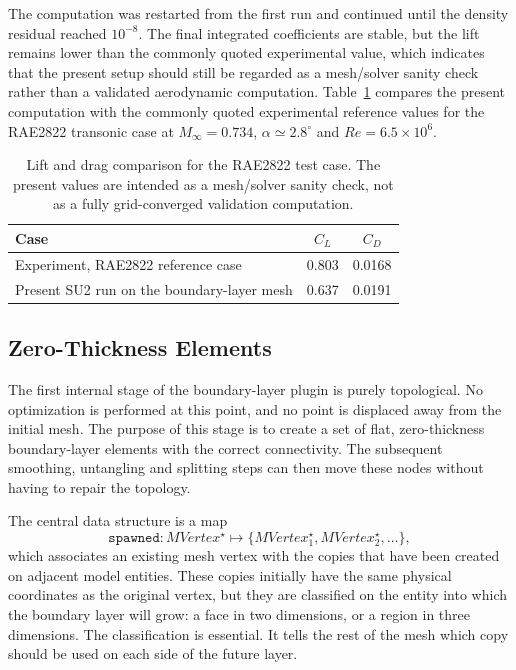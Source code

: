 \documentclass[11pt]{article}
\begin{document}
The computation was restarted from the first run and continued until the
density residual reached \(10^{-8}\). The final integrated coefficients are
stable, but the lift remains lower than the commonly quoted experimental value,
which indicates that the present setup should still be regarded as a
mesh/solver sanity check rather than a validated aerodynamic computation.
Table~\ref{tab:rae2822-clcd} compares the present computation with the
commonly quoted
experimental reference values for the RAE2822 transonic case at
\(M_\infty=0.734\), \(\alpha\simeq 2.8^\circ\) and \(Re=6.5\times 10^6\).

\begin{table}[htbp]
\centering
\begin{tabular}{l|c|c}
Case & \(C_L\) & \(C_D\) \\
\hline
Experiment, RAE2822 reference case & 0.803 & 0.0168 \\
Present SU2 run on the boundary-layer mesh & 0.637 & 0.0191
\end{tabular}
\caption{Lift and drag comparison for the RAE2822 test case. The
present values are intended as a mesh/solver sanity check, not as a fully
grid-converged validation computation.}
\label{tab:rae2822-clcd}
\end{table}

\subsection{Zero-Thickness Elements}

The first internal stage of the boundary-layer plugin is purely topological. No
optimization is performed at this point, and no point is displaced away from the
initial mesh. The purpose of this stage is to create a set of flat,
zero-thickness boundary-layer elements with the correct connectivity. The
subsequent smoothing, untangling and splitting steps can then move these nodes
without having to repair the topology.

The central data structure is a map
\[
  \texttt{spawned} : MVertex^\star \mapsto
  \{MVertex^\star_1,MVertex^\star_2,\ldots\},
\]
which associates an existing mesh vertex with the copies that have been created
on adjacent model entities. These copies initially have the same physical
coordinates as the original vertex, but they are classified on the entity into
which the boundary layer will grow: a face in two dimensions, or a region in
three dimensions. The classification is essential. It tells the rest of the mesh
which copy should be used on each side of the future layer.
\end{document}
